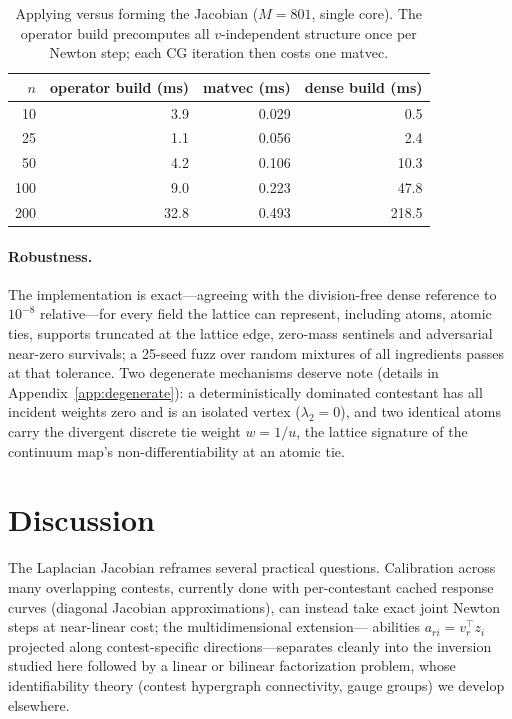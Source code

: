 \documentclass[11pt]{article}
\theoremstyle{definition}
\theoremstyle{remark}
\begin{document}
\begin{table}[t]
\centering
\begin{tabular}{rrrr}
\toprule
$n$ & operator build (ms) & matvec (ms) & dense build (ms) \\
\midrule
 10 &  3.9 & 0.029 &   0.5 \\
 25 &  1.1 & 0.056 &   2.4 \\
 50 &  4.2 & 0.106 &  10.3 \\
100 &  9.0 & 0.223 &  47.8 \\
200 & 32.8 & 0.493 & 218.5 \\
\bottomrule
\end{tabular}
\caption{Applying versus forming the Jacobian ($M = 801$, single core).
The operator build precomputes all $v$-independent structure once per
Newton step; each CG iteration then costs one matvec.}
\label{tab:timing}
\end{table}

\paragraph{Robustness.}
The implementation is exact---agreeing with the division-free dense
reference to $10^{-8}$ relative---for every field the lattice can represent,
including atoms, atomic ties, supports truncated at the lattice edge,
zero-mass sentinels and adversarial near-zero survivals; a 25-seed fuzz over
random mixtures of all ingredients passes at that tolerance.  Two degenerate
mechanisms deserve note (details in Appendix~\ref{app:degenerate}): a
deterministically dominated contestant has all incident weights zero and is
an isolated vertex ($\lambda_2 = 0$), and two identical atoms carry the
divergent discrete tie weight $w = 1/u$, the lattice signature of the
continuum map's non-differentiability at an atomic tie.

\section{Discussion}
\label{sec:discussion}

The Laplacian Jacobian reframes several practical questions.  Calibration
across many overlapping contests, currently done with per-contestant cached
response curves (diagonal Jacobian approximations), can instead take exact
joint Newton steps at near-linear cost; the multidimensional extension---
abilities $a_{ri} = v_r^\top z_i$ projected along contest-specific
directions---separates cleanly into the inversion studied here followed by a
linear or bilinear factorization problem, whose identifiability theory
(contest hypergraph connectivity, gauge groups) we develop elsewhere.
\end{document}
